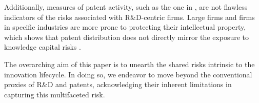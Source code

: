 \documentclass[12pt, letterpaper]{article}
\begin{document}
Additionally, measures of patent activity, such as the one in \cite{Kogan2017-fx}, are not flawless indicators of the risks associated with R\&D-centric firms. Large firms and firms in specific industries are more prone to protecting their intellectual property, which shows that patent distribution does not directly mirror the exposure to knowledge capital risks \citep{mezzanotti2023innovation}.

The overarching aim of this paper is to unearth the shared risks intrinsic to the innovation lifecycle. In doing so, we endeavor to move beyond the conventional proxies of R\&D and patents, acknowledging their inherent limitations in capturing this multifaceted risk.

%
%
%
%
\end{document}
